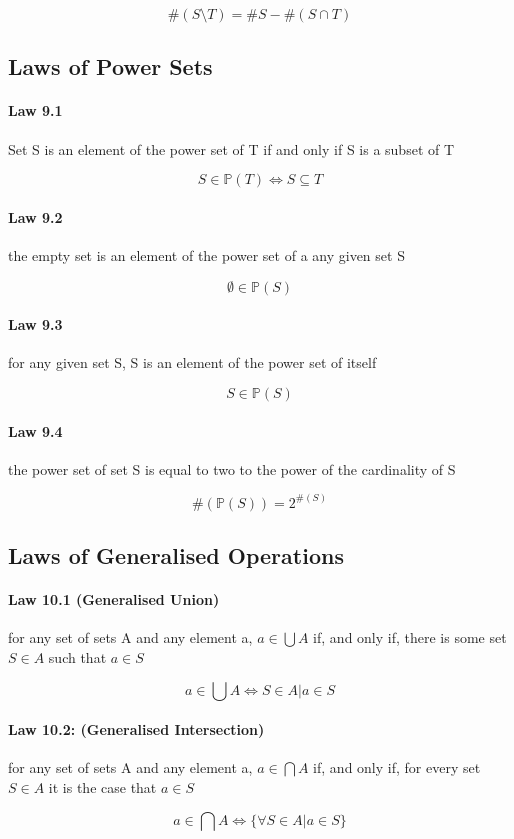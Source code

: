 \documentclass[twocolumn]{article}
\begin{document}
$$ \#(S \setminus T) = \#S - \#(S  \cap  T) $$

\subsection{Laws of Power Sets}

\paragraph{Law 9.1} Set S is an element of the power set of T if and only if S is a subset of T

$$ S  \in  \mathbb{P} (T) \iff S  \subseteq  T $$

\paragraph{Law 9.2} the empty set is an element of the power set of a any given set S

$$  \emptyset  \in   \mathbb{P} (S) $$

\paragraph{Law 9.3} for any given set S, S is an element of the power set of itself

$$ S  \in  \mathbb{P} (S) $$

\paragraph{Law 9.4} the power set of set S is equal to two to the power of the cardinality of S

$$ \#( \mathbb{P} (S)) = 2^{\#(S)} $$

\subsection{Laws of Generalised Operations}

\paragraph{Law 10.1 (Generalised Union)} for any set of sets A and any element a, $a  \in   \bigcup  A $ if, and only if, there is some set $S  \in  A $ such that $ a  \in  S$

$$a  \in   \bigcup A \iff S  \in  A|a  \in  S$$

\paragraph{Law 10.2: (Generalised Intersection)} for any set of sets A and any element a, $a  \in  \bigcap A$ if, and only if, for every set $ S  \in  A $ it is the case that $ a  \in  S$

$$a  \in   \bigcap  A \iff \{ \forall S  \in  A |a  \in  S \}$$
\end{document}
